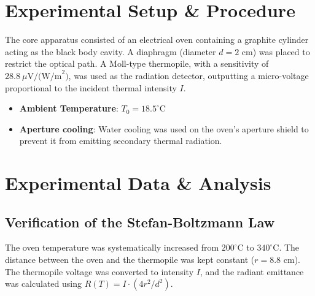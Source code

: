\documentclass[a4paper,11pt]{article}
\begin{document}
\section{Experimental Setup \& Procedure}
The core apparatus consisted of an electrical oven containing a graphite cylinder acting as the black body cavity. A diaphragm (diameter $d = 2\text{ cm}$) was placed to restrict the optical path. A Moll-type thermopile, with a sensitivity of $28.8\ \mu\text{V/(W/m}^2\text{)}$, was used as the radiation detector, outputting a micro-voltage proportional to the incident thermal intensity $I$.

\begin{itemize}
    \item \textbf{Ambient Temperature}: $T_0 = 18.5^\circ\text{C}$
    \item \textbf{Aperture cooling}: Water cooling was used on the oven's aperture shield to prevent it from emitting secondary thermal radiation.
\end{itemize}

\section{Experimental Data \& Analysis}

\subsection{Verification of the Stefan-Boltzmann Law}
The oven temperature was systematically increased from $200^\circ\text{C}$ to $340^\circ\text{C}$. The distance between the oven and the thermopile was kept constant ($r = 8.8\text{ cm}$). The thermopile voltage was converted to intensity $I$, and the radiant emittance was calculated using $R(T) = I \cdot (4r^2/d^2)$.
\end{document}
